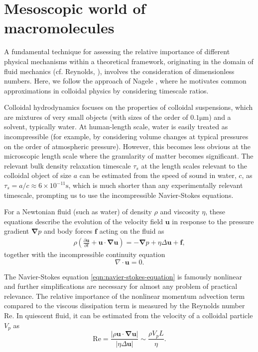 \documentclass{doctoral}
\newcommand{\pd}{\partial}
\newcommand{\Reynolds}{\mathrm{Re}}
\begin{document}
\section{Mesoscopic world of macromolecules}

A fundamental technique for assessing the relative importance of different physical mechanisms within a theoretical framework, originating in the domain of fluid mechanics (cf.
Reynolds, \cite{Reynolds_1883}), involves the consideration of dimensionless numbers.
Here, we follow the approach of Nagele \cite{Nagele_2013}, where he motivates common approximations in colloidal physics by considering timescale ratios.

Colloidal hydrodynamics focuses on the properties of colloidal suspensions, which are mixtures of very small objects (with sizes of the order of $0.1 \mathrm{\mu m}$) and a solvent, typically water.
At human-length scale, water is easily treated as incompressible (for example, by considering volume changes at typical pressures on the order of atmospheric pressure).
However, this becomes less obvious at the microscopic length scale where the granularity of matter becomes significant.
The relevant bulk density relaxation timescale $\tau_s$ at the length scales relevant to the colloidal object of size $a$ can be estimated from the speed of sound in water, $c$, as $\tau_s = a/c \approx 6 \times 10^{-11} \mathrm{s}$, which is much shorter than any experimentally relevant timescale, prompting us to use the incompressible Navier-Stokes equations.

For a Newtonian fluid (such as water) of density $\rho$ and viscosity $\eta$, these equations describe the evolution of the velocity field $\bm{u}$ in response to the pressure gradient $\bm{\nabla} p$ and body forces $\bm{f}$ acting on the fluid as
\begin{eqnarray}
    \rho \left( \frac{\pd \bm{u}}{\pd t} + \bm{u} \cdot \bm{\nabla u} \right) = - \bm{\nabla} p + \eta \Delta \bm{u} + \bm{f}, \label{eqn:navier-stokes-equation}
\end{eqnarray}
together with the incompressible continuity equation
\begin{equation}
    \nabla \cdot \bm{u} = 0 \label{eqn:incompressibility}.
\end{equation}

The Navier-Stokes equation \eqref{eqn:navier-stokes-equation} is famously nonlinear and further simplifications are necessary for almost any problem of practical relevance.
The relative importance of the nonlinear momentum advection term compared to the viscous dissipation term is measured by the Reynolds number $\Reynolds$\cite{Reynolds_1883}.
In quiescent fluid, it can be estimated from the velocity of a colloidal particle $V_p$ as
\begin{equation}
    \Reynolds = \frac{|\rho \bm{u} \cdot \bm{\nabla}\bm{u}|}{|\eta \Delta \bm{u}|} \sim \frac{\rho V_p L}{\eta}.
    \label{eqn:reynolds-based-estimate}
\end{equation}
\end{document}
